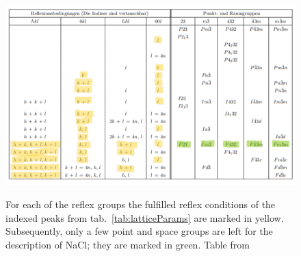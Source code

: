 \begin{figure}[ht]
    \centering
    \includegraphics[angle = 90, width = 0.8 \linewidth]{Bilder/Auswertung/NaCl/table extinktion marked.png}
    \label{fig:reflexCond}
    \caption{For each of the reflex groups the fulfilled reflex conditions of the indexed peaks from tab.~\ref{tab:latticeParams} are marked in yellow. Subsequently, only a few point and space groups are left for the description of NaCl; they are marked in green. Table from~\cite{Aroyo2016}}
\end{figure}


